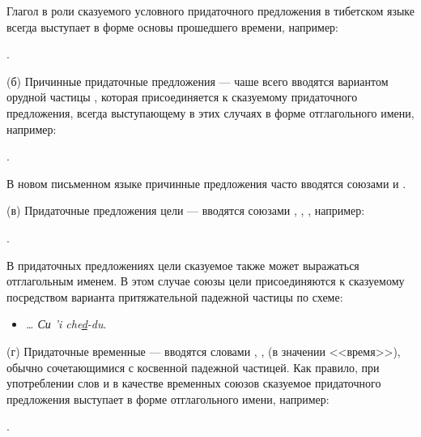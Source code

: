 Глагол в роли сказуемого условного придаточного предложения в тибетском языке всегда выступает в форме основы прошедшего времени, например:
\begin{prfsample}
	\item {}.
\end{prfsample}

(б)	Причинные придаточные предложения --- чаше всего вводятся вариантом орудной частицы , которая присоединяется к сказуемому придаточного предложения, всегда выступающему в этих случаях в форме отглагольного имени, например:
\begin{prfsample}
	\item {}.
\end{prfsample}

В новом письменном языке причинные предложения часто вводятся союзами  и .

(в)	Придаточные предложения цели --- вводятся союзами , , , например:
\begin{prfsample}
	\item {}.
\end{prfsample}
В придаточных предложениях цели сказуемое также может выражаться отглагольным именем. В этом случае союзы цели присоединяются к сказуемому посредством варианта притяжательной падежной частицы  по схеме:
\begin{itemize}
	\item \emph{\ldots{} Си 'i che\ul{d}-du}.
\end{itemize}

(г)	Придаточные временные --- вводятся словами
, ,  (в значении <<время>>), обычно сочетающимися с косвенной падежной частицей. Как правило, при употреблении слов  и  в качестве временных союзов сказуемое придаточного предложения выступает в форме отглагольного имени, например:
\begin{prfsample}
	\item {}.
\end{prfsample}

